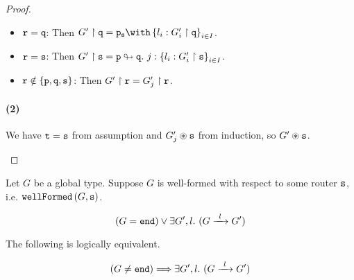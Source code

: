 \begin{proof}
\begin{itemize}
\begin{itemize}
\item ${\mathtt{r}} = {\mathtt{q}}$:
Then $\proj{G'}{q} = \tbraproxy{p}{s}{l_i: \proj{G'_i}{q}}{i \in I}$.

\item ${\mathtt{r}} = {\mathtt{s}}$:
Then ${G'} \upharpoonright {\mathtt{s}} = {\mathtt{p}} \looparrowright {\mathtt{q}}. ~ {j} : \left\{{l_i: {G'_i} \upharpoonright {\mathtt{s}}}\right\}_{i \in I}$.

\item ${\mathtt{r}} \notin \{ {\mathtt{p}}, {\mathtt{q}}, {\mathtt{s}} \}$:
Then ${G'} \upharpoonright {\mathtt{r}} = {G'_j} \upharpoonright {\mathtt{r}}$.

\end{itemize}

\paragraph{(2)}
We have ${\mathtt{t}} = {\mathtt{s}}$
from assumption and
${G'_j} \circledast {\mathtt{s}}$ from induction, so ${G'} \circledast {\mathtt{s}}$.

\end{itemize}

\end{proof}

\begin{lemma}
Let $G$ be a global type.
Suppose $G$ is well-formed with respect to some router ${\mathtt{s}}$,
i.e. $\textnormal{\texttt{wellFormed}}\left(G, {\mathtt{s}}\right)$.

\[
(G = \tend) \vee \exists G', l. ~ (\treduce{G}{G'}{l})
\]

The following is logically equivalent.

\[
(G \neq \tend)
	\Longrightarrow 
\exists G', l. ~ (\treduce{G}{G'}{l})
\]

\label{lem:progresswf}
\end{lemma}

